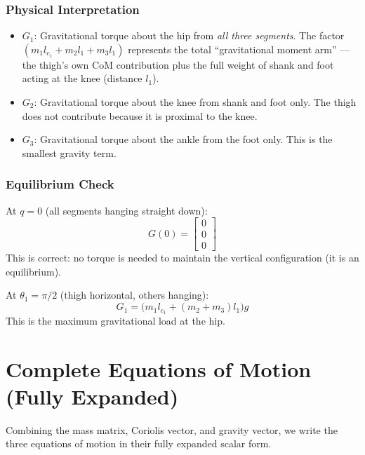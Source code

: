 \documentclass[11pt,a4paper]{article}
\newcommand{\vc}[1]{\bm{#1}}
\def\vc#1{#1}%
\def\bm#1{#1}%
\begin{document}
\subsubsection*{Physical Interpretation}
\begin{itemize}
    \item $G_1$: Gravitational torque about the hip from \textit{all three segments}.
          The factor $(m_1 l_{c_1} + m_2 l_1 + m_3 l_1)$ represents the total
          ``gravitational moment arm'' --- the thigh's own CoM contribution plus
          the full weight of shank and foot acting at the knee (distance $l_1$).
    \item $G_2$: Gravitational torque about the knee from shank and foot only.
          The thigh does not contribute because it is proximal to the knee.
    \item $G_3$: Gravitational torque about the ankle from the foot only.
          This is the smallest gravity term.
\end{itemize}

\subsubsection*{Equilibrium Check}

At $\vc{q} = \vc{0}$ (all segments hanging straight down):
\begin{equation}
    \vc{G}(\vc{0}) = \begin{bmatrix} 0 \\ 0 \\ 0 \end{bmatrix}
\end{equation}
This is correct: no torque is needed to maintain the vertical configuration
(it is an equilibrium).

At $\theta_1 = \pi/2$ (thigh horizontal, others hanging):
\begin{equation}
    G_1 = \bigl(m_1 l_{c_1} + (m_2+m_3) l_1\bigr) g
\end{equation}
This is the maximum gravitational load at the hip.


\section{Complete Equations of Motion (Fully Expanded)}

Combining the mass matrix, Coriolis vector, and gravity vector, we write
the three equations of motion in their fully expanded scalar form.
\end{document}
